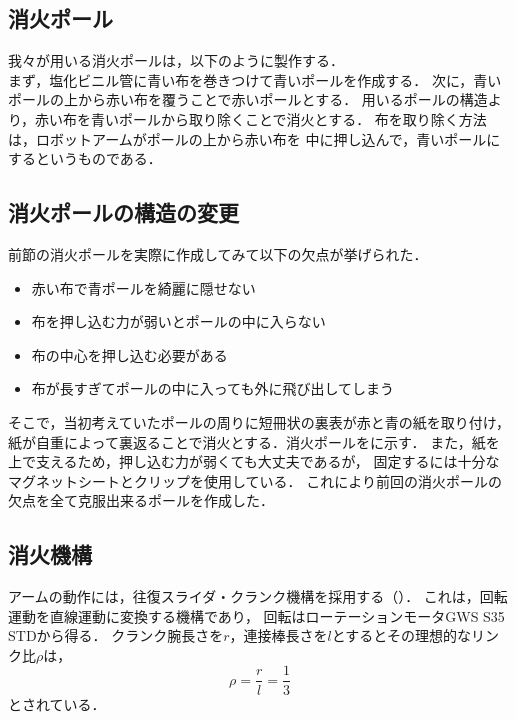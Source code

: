 \documentclass[11pt,a4]{jsarticle}
\begin{document}

  \subsection{消火ポール}
    我々が用いる消火ポールは，以下のように製作する．\\
    まず，塩化ビニル管に青い布を巻きつけて青いポールを作成する．
    次に，青いポールの上から赤い布を覆うことで赤いポールとする．
    用いるポールの構造より，赤い布を青いポールから取り除くことで消火とする．
    布を取り除く方法は，ロボットアームがポールの上から赤い布を
    中に押し込んで，青いポールにするというものである．

  \subsection{消火ポールの構造の変更}
    前節の消火ポールを実際に作成してみて以下の欠点が挙げられた．
    \begin{itemize}
      \item 赤い布で青ポールを綺麗に隠せない
      \item 布を押し込む力が弱いとポールの中に入らない
      \item 布の中心を押し込む必要がある
      \item 布が長すぎてポールの中に入っても外に飛び出してしまう
    \end{itemize}
    そこで，当初考えていたポールの周りに短冊状の裏表が赤と青の紙を取り付け，
    紙が自重によって裏返ることで消火とする．消火ポールをに示す．
    また，紙を上で支えるため，押し込む力が弱くても大丈夫であるが，
    固定するには十分なマグネットシートとクリップを使用している．
    これにより前回の消火ポールの欠点を全て克服出来るポールを作成した．


  \subsection{消火機構}  %

    アームの動作には，往復スライダ・クランク機構を採用する（）．
    これは，回転運動を直線運動に変換する機構であり，
    回転はローテーションモータGWS S35 STDから得る．
    クランク腕長さを$r$，連接棒長さを$l$とするとその理想的なリンク比$\rho$は，
    \begin{equation}
      \rho = \frac{r}{l}=\frac{1}{3}
    \end{equation}
    とされている．
\end{document}

